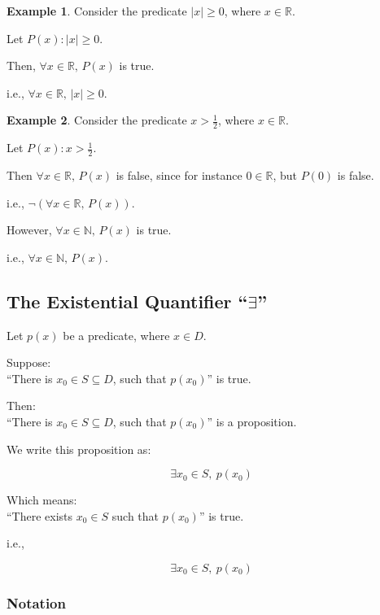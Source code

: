 \documentclass[
]{book}
\theoremstyle{definition}
\theoremstyle{definition}
\newtheorem{example}{Example}[chapter]
\theoremstyle{definition}
\theoremstyle{definition}
\theoremstyle{remark}
\begin{document}
\begin{example}
\protect\hypertarget{exm:unnamed-chunk-48}{}\label{exm:unnamed-chunk-48}Consider the predicate \(|x| \geq 0\), where \(x \in \mathbb{R}\).

Let \(P(x): |x| \geq 0\).

Then, \(\forall x \in \mathbb{R},\, P(x)\) is true.

i.e., \(\forall x \in \mathbb{R},\, |x| \geq 0\).
\end{example}

\begin{example}
\protect\hypertarget{exm:unnamed-chunk-49}{}\label{exm:unnamed-chunk-49}Consider the predicate \(x > \frac{1}{2}\), where \(x \in \mathbb{R}\).

Let \(P(x): x > \frac{1}{2}\).

Then \(\forall x \in \mathbb{R},\, P(x)\) is false, since for instance \(0 \in \mathbb{R}\), but \(P(0)\) is false.

i.e., \(\neg (\forall x \in \mathbb{R},\, P(x))\).

However, \(\forall x \in \mathbb{N},\, P(x)\) is true.

i.e., \(\forall x \in \mathbb{N},\, P(x)\).
\end{example}

\subsection{\texorpdfstring{The Existential Quantifier ``\(\exists\)''}{The Existential Quantifier ``\textbackslash exists''}}\label{the-existential-quantifier-exists}

Let \(p(x)\) be a predicate, where \(x \in D\).

Suppose:\\
``There is \(x_0 \in S \subseteq D\), such that \(p(x_0)\)'' is true.

Then:\\
``There is \(x_0 \in S \subseteq D\), such that \(p(x_0)\)'' is a proposition.

We write this proposition as:

\[ \exists x_0 \in S,\ p(x_0) \]

Which means:\\
``There exists \(x_0 \in S\) such that \(p(x_0)\)'' is true.

i.e.,

\[ \exists x_0 \in S,\ p(x_0) \]

\subsubsection{Notation}\label{notation-1}
\end{document}
